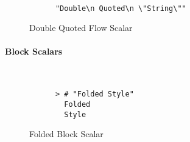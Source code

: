 \begin{figure}[H]
  \begin{minipage}[t]{0.48\textwidth}
    \vspace{0pt}
    \begin{bchart}[max=9, width=0.85\textwidth]
    \end{bchart}
  \end{minipage}
  \begin{minipage}[t]{0pt}~\end{minipage}
  \begin{minipage}[t]{0.48\textwidth}
    \vspace{0pt}
    \begin{verbatim}
      "Double\n Quoted\n \"String\""
    \end{verbatim}
  \end{minipage}
  \caption{Double Quoted Flow Scalar}
\end{figure}

\paragraph{Block Scalars}

\begin{figure}[H]
  \begin{minipage}[t]{0.48\textwidth}
    \vspace{0pt}
    \begin{bchart}[max=9, width=0.85\textwidth]
    \end{bchart}
  \end{minipage}
  \begin{minipage}[t]{0pt}~\end{minipage}
  \begin{minipage}[t]{0.48\textwidth}
    \vspace{0pt}
    \begin{verbatim}
      > # "Folded Style"
        Folded
        Style
    \end{verbatim}
  \end{minipage}
  \caption{Folded Block Scalar}
\end{figure}

